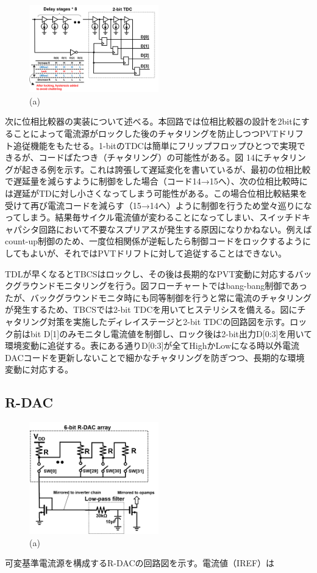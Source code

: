 \documentclass[letterpaper, 10 pt, conference]{ieeeconf}  %
\begin{document}
\begin{figure}[!]
\centering
 \includegraphics[width=0.5\textwidth]{figs/tdc.png}
  \caption{(a) 
}
\label{fig2}
\end{figure}

次に位相比較器の実装について述べる。本回路では位相比較器の設計を2bitにすることによって電流源がロックした後のチャタリングを防止しつつPVTドリフト追従機能をもたせる。1-bitのTDCは簡単にフリップフロップひとつで実現できるが、コードばたつき（チャタリング）の可能性がある。図 14にチャタリングが起きる例を示す。これは誇張して遅延変化を書いているが、最初の位相比較で遅延量を減らすように制御をした場合（コード14→15へ）、次の位相比較時には遅延がTDに対し小さくなってしまう可能性がある。この場合位相比較結果を受けて再び電流コードを減らす（15→14へ）ように制御を行うため堂々巡りになってしまう。結果毎サイクル電流値が変わることになってしまい、スイッチドキャパシタ回路において不要なスプリアスが発生する原因になりかねない。例えばcount-up制御のため、一度位相関係が逆転したら制御コードをロックするようにしてもよいが、それではPVTドリフトに対して追従することはできない。

TDLが早くなるとTBCSはロックし、その後は長期的なPVT変動に対応するバックグラウンドモニタリングを行う。図フローチャートではbang-bang制御であったが、バックグラウンドモニタ時にも同等制御を行うと常に電流のチャタリングが発生するため、TBCSでは2-bit TDCを用いてヒステリシスを備える。図にチャタリング対策を実施したディレイステージと2-bit TDCの回路図を示す。ロック前はbit D[1]のみモニタし電流値を制御し、ロック後は2-bit出力D[0:3]を用いて環境変動に追従する。表にある通りD[0:3]が全てHighかLowになる時以外電流DACコードを更新しないことで細かなチャタリングを防ぎつつ、長期的な環境変動に対応する。

\subsection{R-DAC}
\begin{figure}[!]
\centering
 \includegraphics[width=0.5\textwidth]{figs/rdac.png}
  \caption{(a) 
}
\label{fig2}
\end{figure}
可変基準電流源を構成するR-DACの回路図を示す。電流値（IREF）は
\end{document}
